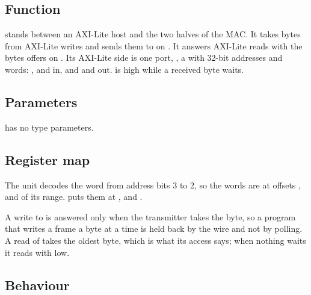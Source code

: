 
%
{}

\subsection*{Function}

 stands between an AXI-Lite host and the two halves of
the MAC. It takes bytes from AXI-Lite writes and sends them to
 on . It answers AXI-Lite reads with the bytes
 offers on . Its AXI-Lite side is one port,
, a  with 32-bit addresses and words:
,  and  in, and 
and  out.  is high while a received byte waits.

\subsection*{Parameters}

 has no type parameters.

\subsection*{Register map}

The unit decodes the word from address bits 3 to 2, so the words are at
offsets ,  and  of its range.
 puts them at ,  and
.


A write to  is answered only when the transmitter takes
the byte, so a program that writes a frame a byte at a time is held
back by the wire and not by polling. A read of  takes the
oldest byte, which is what its access says; when nothing waits it
reads with  low.


\subsection*{Behaviour}

